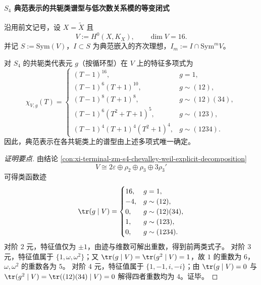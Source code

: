 \paragraph{\texorpdfstring{$S_4$}{S4} 典范表示的共轭类谱型与低次数关系模的等变闭式}
沿用前文记号，设 \(X=\widetilde{X}\) 且
\[
V:=H^0(X,K_X),\qquad \dim V=16.
\]
并记 \(S:=\mathrm{Sym}(V)\)，\(I\subset S\) 为典范嵌入的齐次理想，\(I_m:=I\cap \mathrm{Sym}^mV\)。

\begin{conclusion}[典范表示在共轭类上的特征多项式刚性确定]\label{con:xi-terminal-zm-s4-canonical-characteristic-polynomial-conjugacy-rigidity}
对 \(S_4\) 的共轭类代表元 \(g\)（按循环型）在 \(V\) 上的特征多项式为
\[
\chi_{V,g}(T)=
\begin{cases}
(T-1)^{16}, & g=1,\\[1mm]
(T-1)^6(T+1)^{10}, & g\sim(12),\\[1mm]
(T-1)^8(T+1)^8, & g\sim(12)(34),\\[1mm]
(T-1)^6(T^2+T+1)^5, & g\sim(123),\\[1mm]
(T-1)^4(T+1)^4(T^2+1)^4, & g\sim(1234).
\end{cases}
\]
因此，典范表示在各共轭类上的谱型由上述多项式唯一确定。
\end{conclusion}
\begin{proof}[证明要点]
由结论 \ref{con:xi-terminal-zm-s4-chevalley-weil-explicit-decomposition}
\[
V\cong 2\varepsilon\oplus \rho_2\oplus \rho_3\oplus 3\rho_3'
\]
可得类函数迹
\[
\tr(g\mid V)=
\begin{cases}
16,& g=1,\\
-4,& g\sim(12),\\
0,& g\sim(12)(34),\\
1,& g\sim(123),\\
0,& g\sim(1234).
\end{cases}
\]
对阶 \(2\) 元，特征值仅为 \(\pm1\)，由迹与维数可解出重数，得到前两类式子。
对阶 \(3\) 元，特征值属于 \(\{1,\omega,\omega^2\}\)；又 \(\tr(g\mid V)=\tr(g^2\mid V)=1\)，故 \(1\) 的重数为 \(6\)，\(\omega,\omega^2\) 的重数各为 \(5\)。
对阶 \(4\) 元，特征值属于 \(\{1,-1,i,-i\}\)；由 \(\tr(g\mid V)=0\) 与 \(\tr(g^2\mid V)=\tr((12)(34)\mid V)=0\) 解得四者重数均为 \(4\)。证毕。
\end{proof}

